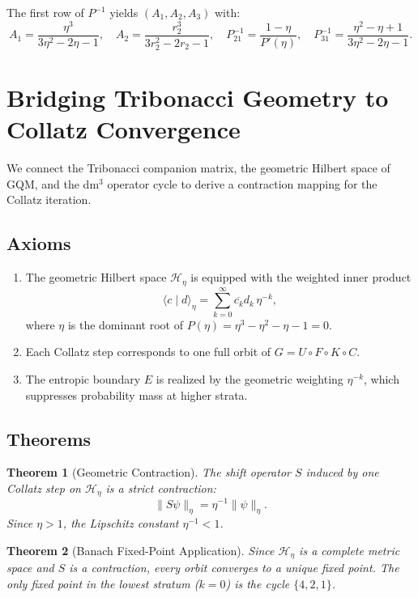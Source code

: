 \documentclass[11pt,a4paper]{article}
\newtheorem{theorem}{Theorem}[section]
\theoremstyle{definition}
\theoremstyle{remark}
\begin{document}
The first row of $P^{-1}$ yields $(A_1,A_2,A_3)$ with:
\[
  A_1=\frac{\eta^3}{3\eta^2-2\eta-1},\quad
  A_2=\frac{r_2^3}{3r_2^2-2r_2-1},\quad
  P^{-1}_{21}=\frac{1-\eta}{P'(\eta)},\quad
  P^{-1}_{31}=\frac{\eta^2-\eta+1}{3\eta^2-2\eta-1}.
\]

\section{Bridging Tribonacci Geometry to Collatz Convergence}

We connect the Tribonacci companion matrix, the geometric Hilbert space of GQM, and the dm$^3$
operator cycle to derive a contraction mapping for the Collatz iteration.

\subsection{Axioms}

\begin{enumerate}
  \item[\textbf{A1}] The geometric Hilbert space $\mathcal{H}_\eta$ is equipped with the
  weighted inner product
  \[
    \langle c\mid d\rangle_\eta=\sum_{k=0}^\infty\overline{c_k}d_k\,\eta^{-k},
  \]
  where $\eta$ is the dominant root of $P(\eta)=\eta^3-\eta^2-\eta-1=0$.
  \item[\textbf{A2}] Each Collatz step corresponds to one full orbit of $G=U\circ F\circ K\circ C$.
  \item[\textbf{A3}] The entropic boundary $E$ is realized by the geometric weighting $\eta^{-k}$,
  which suppresses probability mass at higher strata.
\end{enumerate}

\subsection{Theorems}

\begin{theorem}[Geometric Contraction]
The shift operator $S$ induced by one Collatz step on $\mathcal{H}_\eta$ is a strict contraction:
\[
  \|S\psi\|_\eta=\eta^{-1}\|\psi\|_\eta.
\]
Since $\eta>1$, the Lipschitz constant $\eta^{-1}<1$.
\end{theorem}

\begin{theorem}[Banach Fixed-Point Application]
Since $\mathcal{H}_\eta$ is a complete metric space and $S$ is a contraction, every orbit
converges to a unique fixed point. The only fixed point in the lowest stratum ($k=0$) is the
cycle $\{4,2,1\}$.
\end{theorem}
\end{document}

